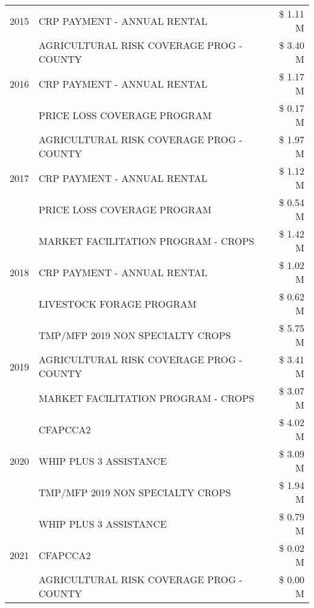\begin{tabular}{llr}
\cline{1-3}
2015 & CRP PAYMENT - ANNUAL RENTAL & \$ 1.11 M \\
\cline{1-3}
\multirow[t]{3}{*}{2016} & AGRICULTURAL RISK COVERAGE PROG - COUNTY & \$ 3.40 M \\
 & CRP PAYMENT - ANNUAL RENTAL & \$ 1.17 M \\
 & PRICE LOSS COVERAGE PROGRAM & \$ 0.17 M \\
\cline{1-3}
\multirow[t]{3}{*}{2017} & AGRICULTURAL RISK COVERAGE PROG - COUNTY & \$ 1.97 M \\
 & CRP PAYMENT - ANNUAL RENTAL & \$ 1.12 M \\
 & PRICE LOSS COVERAGE PROGRAM & \$ 0.54 M \\
\cline{1-3}
\multirow[t]{3}{*}{2018} & MARKET FACILITATION PROGRAM - CROPS & \$ 1.42 M \\
 & CRP PAYMENT - ANNUAL RENTAL & \$ 1.02 M \\
 & LIVESTOCK FORAGE PROGRAM & \$ 0.62 M \\
\cline{1-3}
\multirow[t]{3}{*}{2019} & TMP/MFP 2019 NON SPECIALTY CROPS & \$ 5.75 M \\
 & AGRICULTURAL RISK COVERAGE PROG - COUNTY & \$ 3.41 M \\
 & MARKET FACILITATION PROGRAM - CROPS & \$ 3.07 M \\
\cline{1-3}
\multirow[t]{3}{*}{2020} & CFAPCCA2 & \$ 4.02 M \\
 & WHIP PLUS 3 ASSISTANCE & \$ 3.09 M \\
 & TMP/MFP 2019 NON SPECIALTY CROPS & \$ 1.94 M \\
\cline{1-3}
\multirow[t]{3}{*}{2021} & WHIP PLUS 3 ASSISTANCE & \$ 0.79 M \\
 & CFAPCCA2 & \$ 0.02 M \\
 & AGRICULTURAL RISK COVERAGE PROG - COUNTY & \$ 0.00 M \\
\cline{1-3}
\bottomrule
\end{tabular}
